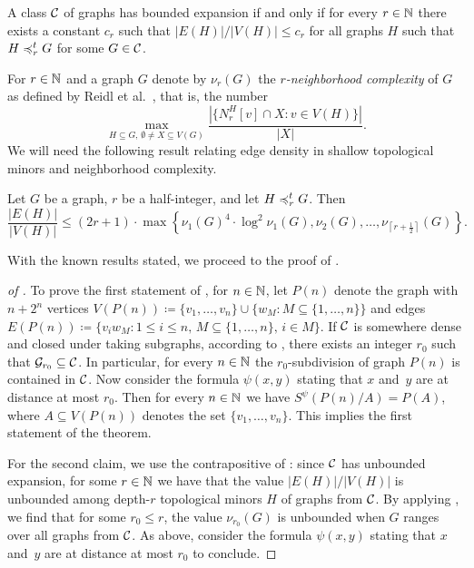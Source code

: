 \begin{lemma}\label{lem:top-bnd-exp}
A class $\mathcal{C}$ of graphs has bounded expansion if and only 
if for every $r\in \mathbb{N}$ there exists a constant $c_r$ such that $|E(H)|/|V(H)|\leq c_r$ for all graphs $H$ such that $H\preccurlyeq_r^tG $ for some $G\in \mathcal{C}$.
\end{lemma}

For $r\in \mathbb{N}$ and a graph $G$ denote by $\nu_r(G)$ the
\emph{$r$-neighborhood complexity} of $G$ as defined
by Reidl et al.~\cite{reidl2016characterising}, that is, the number 
\[\max_{H\subseteq G,\,\emptyset\neq X\subseteq V(G)}\frac{|\{N_r^H[v]\cap X : v\in V(H)\}|}{|X|}.\] 
We will need the following result relating edge density in shallow topological minors and neighborhood complexity.

\begin{lemma}\label{lem:lower-be}
Let $G$ be a graph, $r$ be a half-integer, 
and let $H\preccurlyeq_r^tG$. 
Then 
$$\frac{|E(H)|}{|V(H)|}\leq (2r + 1)\cdot \max \left\{\nu_1(G)^4\cdot \log^2\nu_1(G),\nu_2(G),\ldots, \nu_{\left\lceil r+\frac{1}{2}\right\rceil}(G)\right\}.$$
\end{lemma}

With the known results stated, we proceed to the proof of .

\begin{proof}[of ]
To prove the first statement of , 
for $n\in \mathbb{N}$, let $P(n)$ denote the graph with $n+2^n$ 
vertices $V(P(n))\coloneqq \{v_1,\ldots, v_n\}\cup \{w_M \colon M\subseteq \{1,\ldots, n\}\}$ and edges $E(P(n))\coloneqq \{v_iw_M \colon 1\leq i\leq n,\, M\subseteq \{1,\ldots, n\},\, i\in M\}$. 
If $\mathcal{C}$ is somewhere dense and closed under taking subgraphs, 
according to , there exists an integer $r_0$ 
such that $\mathcal{G}_{r_0}\subseteq \mathcal{C}$. In particular, for every $n\in \mathbb{N}$ the $r_0$-subdivision of graph $P(n)$ is contained in $\mathcal{C}$.
Now consider 
the formula $\psi(x,y)$ stating that $x$ and~$y$ are at distance at most $r_0$. Then for every $n\in \mathbb{N}$ we have 
$S^\psi(P(n)/A)=P(A)$, where $A\subseteq V(P(n))$ denotes the set $\{v_1,\ldots, v_n\}$. This implies the first statement
of the theorem.

For the second claim, we use the contrapositive of : since $\mathcal{C}$ has unbounded expansion, for some $r\in \mathbb{N}$ 
we have that the value $|E(H)|/|V(H)|$ is unbounded among depth-$r$ topological minors $H$ of graphs from $\mathcal{C}$.
By applying , we find that for some $r_0\leq r$, the value
$\nu_{r_0}(G)$ is unbounded when $G$ ranges over all graphs from $\mathcal{C}$. 
As above, consider the formula $\psi(x,y)$ stating that $x$ and~$y$ are at distance at most $r_0$ to conclude. 
\end{proof}

